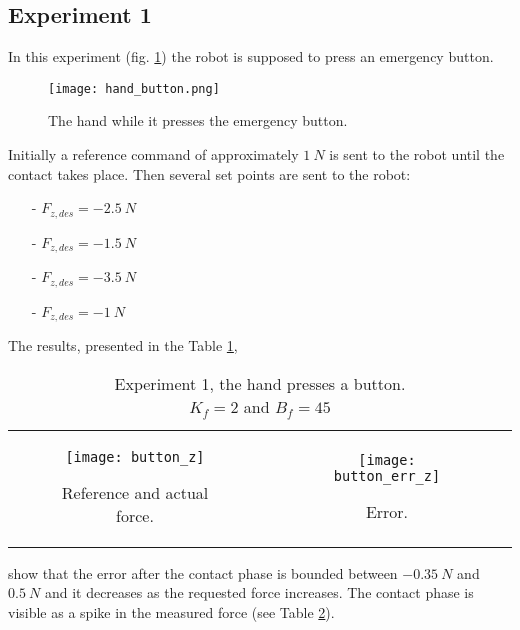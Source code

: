 \subsection{Experiment 1}
In this experiment (fig. \ref{fig:hand_button}) the robot is supposed to press an emergency button.
\begin{figure}[h]
  \centering
  \texttt{[image: hand\_button.png]}
  \caption{The hand while it presses the emergency button. \label{fig:hand_button}}
\end{figure}
\par
Initially a reference command of approximately $\SI{1}{N}$ is sent to the robot
until the contact takes place. Then several set points are sent to the robot:
\begin{itemize}
\item[-] $F_{z,des} = \SI{-2.5}{N}$
\item[-] $F_{z,des} =\SI{-1.5}{N}$
\item[-] $F_{z,des} =\SI{-3.5}{N}$
\item[-] $F_{z,des} =\SI{-1}{N}$
\end{itemize}
\par
The results, presented in the Table \ref{fig:button},
\begin{table}[h]
  \begin{tabular}{cc}
    \begin{subfigure}{0.5\textwidth}
      \centering
      \texttt{[image: button\_z]}
      \caption{Reference and actual force. \label{fig:button_z}}
    \end{subfigure}&
    \begin{subfigure}{0.5\textwidth}
      \centering
      \texttt{[image: button\_err\_z]}
      \caption{Error. \label{fig:button_error_z}}
    \end{subfigure} 
  \end{tabular}
  \caption{Experiment 1, the hand presses a button.\\
  $K_f = 2$ and $B_f = 45$\label{fig:button}}
\end{table}
show that the error after the contact phase is bounded between
$\SI{-0.35}{N}$ and $\SI{0.5}{N}$ and it decreases as the requested force 
increases. The contact phase is visible as a spike in the measured force
(see Table \ref{fig:button_z}).

